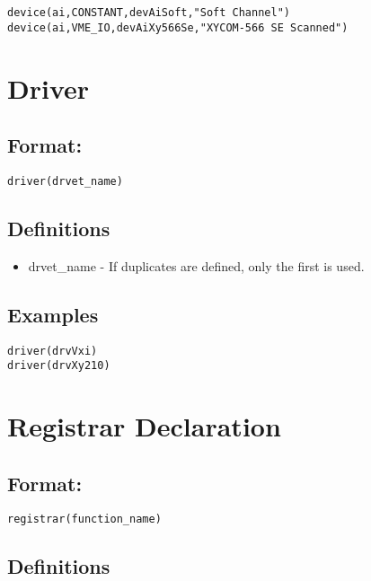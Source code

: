 \begin{verbatim}device(ai,CONSTANT,devAiSoft,"Soft Channel")
device(ai,VME_IO,devAiXy566Se,"XYCOM-566 SE Scanned")
\end{verbatim}\section{Driver}

\subsection{Format:}

\begin{verbatim}driver(drvet_name)
\end{verbatim}\subsection{Definitions}

\begin{itemize}\item {}drvet\_name - If duplicates are defined, only the first is used.

\end{itemize}\subsection{Examples}

\begin{verbatim}driver(drvVxi)
driver(drvXy210)
\end{verbatim}\section{Registrar Declaration}


\subsection{Format:}

\begin{verbatim}registrar(function_name)
\end{verbatim}\subsection{Definitions}

